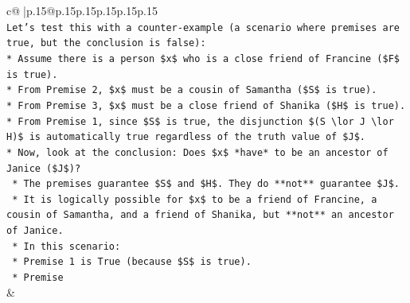 \documentclass{article}
\begin{document}
{\begin{supertabular}{c@{$\;$}|p{.15\linewidth}@{}p{.15\linewidth}p{.15\linewidth}p{.15\linewidth}p{.15\linewidth}p{.15\linewidth}}
{{{\\ 
\texttt{Let's test this with a counter{-}example (a scenario where premises are true, but the conclusion is false):} \\
\texttt{*   Assume there is a person \$x\$ who is a close friend of Francine (\$F\$ is true).} \\
\texttt{*   From Premise 2, \$x\$ must be a cousin of Samantha (\$S\$ is true).} \\
\texttt{*   From Premise 3, \$x\$ must be a close friend of Shanika (\$H\$ is true).} \\
\texttt{*   From Premise 1, since \$S\$ is true, the disjunction \$(S \textbackslash{}lor J \textbackslash{}lor H)\$ is automatically true regardless of the truth value of \$J\$.} \\
\texttt{*   Now, look at the conclusion: Does \$x\$ *have* to be an ancestor of Janice (\$J\$)?} \\
\texttt{    *   The premises guarantee \$S\$ and \$H\$. They do **not** guarantee \$J\$.} \\
\texttt{    *   It is logically possible for \$x\$ to be a friend of Francine, a cousin of Samantha, and a friend of Shanika, but **not** an ancestor of Janice.} \\
\texttt{    *   In this scenario:} \\
\texttt{        *   Premise 1 is True (because \$S\$ is true).} \\
\texttt{        *   Premise} \\
            }
        }
    }
    & \\ \\


\end{supertabular}}
\end{document}
